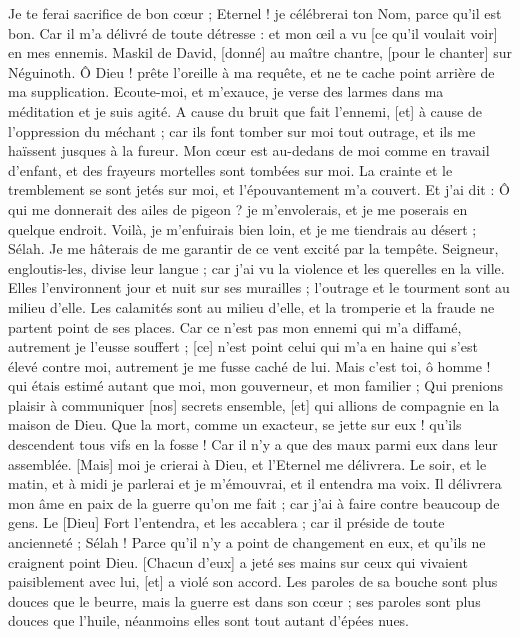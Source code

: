 \begin{multicols}{2}
Je te ferai sacrifice de bon cœur ; Eternel ! je célébrerai ton Nom, parce qu'il est bon.
Car il m'a délivré de toute détresse : et mon œil a vu [ce qu'il voulait voir] en mes ennemis.
\VerseOne{}Maskil de David, [donné] au maître chantre, [pour le chanter] sur Néguinoth. Ô Dieu ! prête l'oreille à ma requête, et ne te cache point arrière de ma supplication.
Ecoute-moi, et m'exauce, je verse des larmes dans ma méditation et je suis agité.
A cause du bruit que fait l'ennemi, [et] à cause de l'oppression du méchant ; car ils font tomber sur moi tout outrage, et ils me haïssent jusques à la fureur.
Mon cœur est au-dedans de moi comme en travail d'enfant, et des frayeurs mortelles sont tombées sur moi.
La crainte et le tremblement se sont jetés sur moi, et l'épouvantement m'a couvert.
Et j'ai dit : Ô qui me donnerait des ailes de pigeon ? je m'envolerais, et je me poserais en quelque endroit.
Voilà, je m'enfuirais bien loin, et je me tiendrais au désert ; Sélah.
Je me hâterais de me garantir de ce vent excité par la tempête.
Seigneur, engloutis-les, divise leur langue ; car j'ai vu la violence et les querelles en la ville.
Elles l'environnent jour et nuit sur ses murailles ; l'outrage et le tourment sont au milieu d'elle.
Les calamités sont au milieu d'elle, et la tromperie et la fraude ne partent point de ses places.
Car ce n'est pas mon ennemi qui m'a diffamé, autrement je l'eusse souffert ; [ce] n'est point celui qui m'a en haine qui s'est élevé contre moi, autrement je me fusse caché de lui.
Mais c'est toi, ô homme ! qui étais estimé autant que moi, mon gouverneur, et mon familier ;
Qui prenions plaisir à communiquer [nos] secrets ensemble, [et] qui allions de compagnie en la maison de Dieu.
Que la mort, comme un exacteur, se jette sur eux ! qu'ils descendent tous vifs en la fosse ! Car il n'y a que des maux parmi eux dans leur assemblée.
[Mais] moi je crierai à Dieu, et l'Eternel me délivrera.
Le soir, et le matin, et à midi je parlerai et je m'émouvrai, et il entendra ma voix.
Il délivrera mon âme en paix de la guerre qu'on me fait ; car j'ai à faire contre beaucoup de gens.
Le [Dieu] Fort l'entendra, et les accablera ; car il préside de toute ancienneté ; Sélah ! Parce qu'il n'y a point de changement en eux, et qu'ils ne craignent point Dieu.
[Chacun d'eux] a jeté ses mains sur ceux qui vivaient paisiblement avec lui, [et] a violé son accord.
Les paroles de sa bouche sont plus douces que le beurre, mais la guerre est dans son cœur ; ses paroles sont plus douces que l'huile, néanmoins elles sont tout autant d'épées nues.

\end{multicols}
